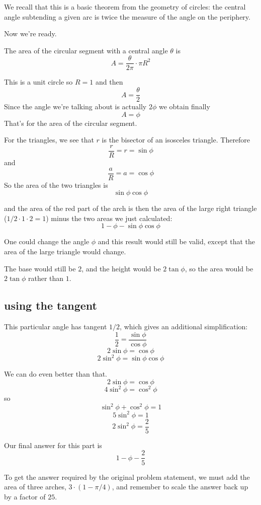 \documentclass[11pt, oneside]{article}
\begin{document}
We recall that this is a basic theorem from the geometry of circles:  the central angle subtending a given arc is twice the measure of the angle on the periphery.

Now we're ready.

The area of the circular segment with a central angle $\theta$ is
\[ A = \frac{\theta}{2 \pi} \cdot \pi R^2 \]

This is a unit circle so $R = 1$ and then
\[ A = \frac{\theta}{2} \]
Since the angle we're talking about is actually $2 \phi$ we obtain finally
\[ A = \phi \]
That's for the area of the circular segment.

For the triangles, we see that $r$ is the bisector of an isosceles triangle.  Therefore
\[ \frac{r}{R} = r = \sin \phi \]
and 
\[ \frac{a}{R} = a = \cos \phi \]
So the area of the two triangles is
\[ \sin \phi \cos \phi \]

and the area of the red part of the arch is then the area of the large right triangle ($1/2 \cdot 1 \cdot 2 = 1$) minus the two areas we just calculated:
\[ 1 - \phi - \sin \phi \cos \phi \]

One could change the angle $\phi$ and this result would still be valid, except that the area of the large triangle would change.

The base would still be $2$, and the height would be $2 \tan \phi$, so the area would be $2 \tan \phi$ rather than $1$.

\subsection*{using the tangent}

This particular angle has tangent $1/2$, which gives an additional simplification:
\[ \frac{1}{2} = \frac{\sin \phi}{\cos \phi} \]
\[ 2 \sin \phi = \cos \phi \]
\[ 2 \sin^2 \phi = \sin \phi \cos \phi \]

We can do even better than that.
\[ 2 \sin \phi = \cos \phi \]
\[ 4 \sin^2 \phi = \cos^2 \phi \]
so
\[ \sin^2 \phi + \cos^2 \phi = 1 \]
\[ 5 \sin^2 \phi = 1 \]
\[ 2 \sin^2 \phi = \frac{2}{5} \]

Our final answer for this part is
\[ 1 - \phi - \frac{2}{5} \]

To get the answer required by the original problem statement, we must add the area of three arches, $3 \cdot (1 - \pi/4)$, and remember to scale the answer back up by a factor of $25$.
\end{document}
